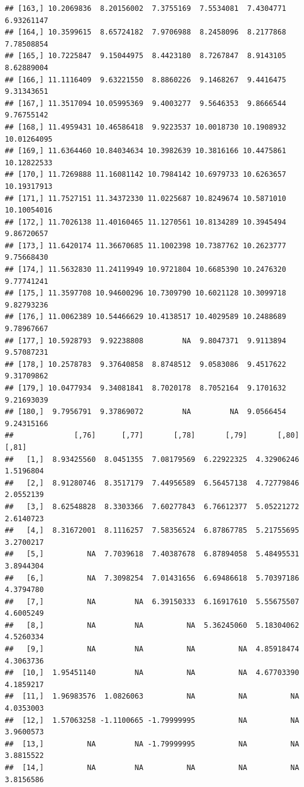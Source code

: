 \documentclass{article}\usepackage[]{graphicx}\usepackage[]{color}
\makeatletter
\newenvironment{kframe}{%
 \def\at@end@of@kframe{}%
 \ifinner\ifhmode%
  \def\at@end@of@kframe{\end{minipage}}%
  \begin{minipage}{\columnwidth}%
 \fi\fi%
 \def\FrameCommand##1{\hskip\@totalleftmargin \hskip-\fboxsep
 \colorbox{shadecolor}{##1}\hskip-\fboxsep
     \hskip-\linewidth \hskip-\@totalleftmargin \hskip\columnwidth}%
 \MakeFramed {\advance\hsize-\width
   \@totalleftmargin\z@ \linewidth\hsize
   \@setminipage}}%
 {\par\unskip\endMakeFramed%
 \at@end@of@kframe}
\newenvironment{knitrout}{}{} %
\makeatother
\begin{document}
\begin{knitrout}
\begin{kframe}
\begin{verbatim}
## [163,] 10.2069836  8.20156002  7.3755169  7.5534081  7.4304771  6.93261147
## [164,] 10.3599615  8.65724182  7.9706988  8.2458096  8.2177868  7.78508854
## [165,] 10.7225847  9.15044975  8.4423180  8.7267847  8.9143105  8.62889004
## [166,] 11.1116409  9.63221550  8.8860226  9.1468267  9.4416475  9.31343651
## [167,] 11.3517094 10.05995369  9.4003277  9.5646353  9.8666544  9.76755142
## [168,] 11.4959431 10.46586418  9.9223537 10.0018730 10.1908932 10.01264095
## [169,] 11.6364460 10.84034634 10.3982639 10.3816166 10.4475861 10.12822533
## [170,] 11.7269888 11.16081142 10.7984142 10.6979733 10.6263657 10.19317913
## [171,] 11.7527151 11.34372330 11.0225687 10.8249674 10.5871010 10.10054016
## [172,] 11.7026138 11.40160465 11.1270561 10.8134289 10.3945494  9.86720657
## [173,] 11.6420174 11.36670685 11.1002398 10.7387762 10.2623777  9.75668430
## [174,] 11.5632830 11.24119949 10.9721804 10.6685390 10.2476320  9.77741241
## [175,] 11.3597708 10.94600296 10.7309790 10.6021128 10.3099718  9.82793236
## [176,] 11.0062389 10.54466629 10.4138517 10.4029589 10.2488689  9.78967667
## [177,] 10.5928793  9.92238808         NA  9.8047371  9.9113894  9.57087231
## [178,] 10.2578783  9.37640858  8.8748512  9.0583086  9.4517622  9.31709862
## [179,] 10.0477934  9.34081841  8.7020178  8.7052164  9.1701632  9.21693039
## [180,]  9.7956791  9.37869072         NA         NA  9.0566454  9.24315166
##              [,76]      [,77]       [,78]       [,79]       [,80]      [,81]
##   [1,]  8.93425560  8.0451355  7.08179569  6.22922325  4.32906246  1.5196804
##   [2,]  8.91280746  8.3517179  7.44956589  6.56457138  4.72779846  2.0552139
##   [3,]  8.62548828  8.3303366  7.60277843  6.76612377  5.05221272  2.6140723
##   [4,]  8.31672001  8.1116257  7.58356524  6.87867785  5.21755695  3.2700217
##   [5,]          NA  7.7039618  7.40387678  6.87894058  5.48495531  3.8944304
##   [6,]          NA  7.3098254  7.01431656  6.69486618  5.70397186  4.3794780
##   [7,]          NA         NA  6.39150333  6.16917610  5.55675507  4.6005249
##   [8,]          NA         NA          NA  5.36245060  5.18304062  4.5260334
##   [9,]          NA         NA          NA          NA  4.85918474  4.3063736
##  [10,]  1.95451140         NA          NA          NA  4.67703390  4.1859217
##  [11,]  1.96983576  1.0826063          NA          NA          NA  4.0353003
##  [12,]  1.57063258 -1.1100665 -1.79999995          NA          NA  3.9600573
##  [13,]          NA         NA -1.79999995          NA          NA  3.8815522
##  [14,]          NA         NA          NA          NA          NA  3.8156586

\end{verbatim}
\end{kframe}
\end{knitrout}
\end{document}
